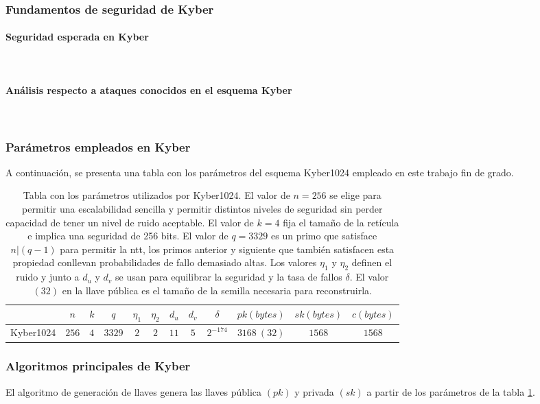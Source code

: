 \subsubsection{Fundamentos de seguridad de Kyber}
\paragraph{Seguridad esperada en Kyber}
\mbox{}\\
\paragraph{Análisis respecto a ataques conocidos en el esquema Kyber}
\mbox{}\\
\subsubsection{Parámetros empleados en Kyber}
A continuación, se presenta una tabla con los parámetros del esquema Kyber1024 empleado en este trabajo fin de grado.
\begin{table}[h]
	\centering
	\renewcommand{\arraystretch}{1.2}
	\begin{tabular}{lccccccccccc}
		\hline
		&\(n\)&\(k\)&\(q\)&\(\eta_1\)&\(\eta_2\)&\(d_u\)&\(d_v\)&\(\delta\)&\(pk (bytes)\)&\(sk (bytes)\)&\(c (bytes)\)\\
		\hline
		Kyber1024&\(256\)&\(4\)&\(3329\)&\(2\)&\(2\)&\(11\)&\(5\)&\(2^{-174}\)&\(3168 \ (32)\)&\(1568\)&\(1568\)\\
		\hline
	\end{tabular}
	\caption{Tabla con los parámetros utilizados por Kyber1024. El valor de \(n=256\) se elige para permitir una escalabilidad sencilla y permitir distintos niveles de seguridad sin perder capacidad de tener un nivel de ruido aceptable. El valor de \(k=4\) fija el tamaño de la retícula e implica una seguridad de 256 bits. El valor de \(q=3329\) es un primo que satisface \(n|(q-1)\) para permitir la \gls{ntt}, los primos anterior y siguiente que también satisfacen esta propiedad conllevan probabilidades de fallo demasiado altas. Los valores $\eta_1$ y $\eta_2$ definen el ruido y junto a \(d_u\) y \(d_v\) se usan para equilibrar la seguridad y la tasa de fallos $\delta$. El valor \((32)\) en la llave pública es el tamaño de la semilla necesaria para reconstruirla.}
	\label{tab:KyberParams}
\end{table}


\newpage

\subsubsection{Algoritmos principales de Kyber \cite{kyber-spec-2021}}
\label{sub:kybAlg}
El algoritmo de generación de llaves genera las llaves pública \((pk)\) y privada \((sk)\) a partir de los parámetros de la tabla \ref{tab:KyberParams}.

